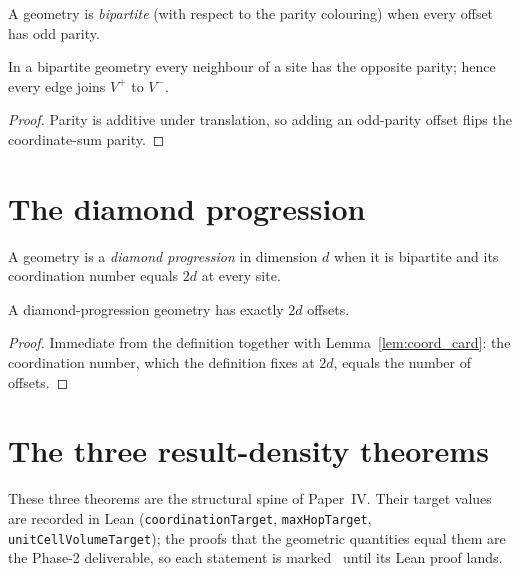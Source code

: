 \begin{definition}
  \label{def:bipartite}
  \leanok
  A geometry is \emph{bipartite} (with respect to the parity colouring) when
  every offset has odd parity.
\end{definition}

\begin{lemma}
  \label{lem:neighbour_parity}
  \leanok
  In a bipartite geometry every neighbour of a site has the opposite parity;
  hence every edge joins $V^{+}$ to $V^{-}$.
\end{lemma}
\begin{proof}
  \leanok
  Parity is additive under translation, so adding an odd-parity offset flips the
  coordinate-sum parity.
\end{proof}

\chapter{The diamond progression}

\begin{definition}
  \label{def:diamond}
  \leanok
  A geometry is a \emph{diamond progression} in dimension $d$ when it is
  bipartite and its coordination number equals $2d$ at every site.
\end{definition}

\begin{proposition}
  \label{prop:offsets_card}
  \leanok
  A diamond-progression geometry has exactly $2d$ offsets.
\end{proposition}
\begin{proof}
  \leanok
  Immediate from the definition together with Lemma~\ref{lem:coord_card}: the
  coordination number, which the definition fixes at $2d$, equals the number of
  offsets.
\end{proof}

\chapter{The three result-density theorems}

These three theorems are the structural spine of Paper~IV. Their target values
are recorded in Lean (\texttt{coordinationTarget}, \texttt{maxHopTarget},
\texttt{unitCellVolumeTarget}); the proofs that the geometric quantities equal
them are the Phase-2 deliverable, so each statement is marked \notready\ until
its Lean proof lands.

